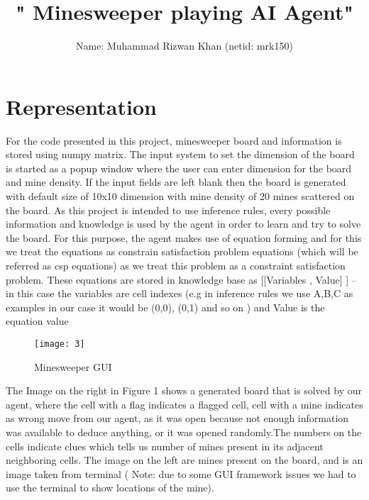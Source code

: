 \documentclass{article}
\title{" Minesweeper playing AI Agent"}
\author{ Name: Muhammad Rizwan Khan (netid: mrk150)}
\date{}
\begin{document}
\maketitle

\section{Representation}
For the code presented in this project, minesweeper board and information is stored using numpy matrix. The input system to set the dimension of the board is started as a popup window  where the user can enter dimension for the board and mine density. If the input fields are left blank then the board is generated with default size of 10x10 dimension with mine density of 20 mines scattered on the board.
As this project is intended to use inference rules, every possible information and knowledge is used by the agent in order to learn and try to solve the board. For this purpose, the agent makes use of equation forming and for this we treat the equations as constrain satisfaction problem equations (which will be referred as csp equations) as we treat this problem as a constraint satisfaction problem. These equations are stored in knowledge base as [[Variables , Value] ] – in this case the variables are cell indexes (e.g in inference rules we use A,B,C as examples in our case it would be (0,0), (0,1) and so on ) and Value is the equation value

\begin{figure}[htp]
    \centering
    \texttt{[image: 3]}
    \caption{Minesweeper GUI}
    \label{fig:board}
\end{figure}
The Image on the right in Figure 1 shows a generated board that is solved by our agent, where the cell with a flag indicates a flagged cell, cell with a mine indicates as wrong move from our agent, as it was open because not enough information was available to deduce anything, or it was opened randomly.The numbers on the cells indicate clues which tells us number of mines present in its adjacent neighboring cells.
The image on the left are mines present on the board, and is an image taken from terminal ( Note: due to some GUI framework issues we had to use the terminal to show locations of the mine).
\\\\
\end{document}
